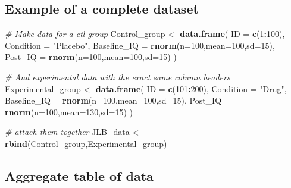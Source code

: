 \documentclass[
]{book}
\newenvironment{Shaded}{\begin{snugshade}}{\end{snugshade}}
\newcommand{\AttributeTok}[1]{\textcolor[rgb]{0.13,0.29,0.53}{#1}}
\newcommand{\CommentTok}[1]{\textcolor[rgb]{0.56,0.35,0.01}{\textit{#1}}}
\newcommand{\DecValTok}[1]{\textcolor[rgb]{0.00,0.00,0.81}{#1}}
\newcommand{\FunctionTok}[1]{\textcolor[rgb]{0.13,0.29,0.53}{\textbf{#1}}}
\newcommand{\NormalTok}[1]{#1}
\newcommand{\OtherTok}[1]{\textcolor[rgb]{0.56,0.35,0.01}{#1}}
\newcommand{\SpecialCharTok}[1]{\textcolor[rgb]{0.81,0.36,0.00}{\textbf{#1}}}
\newcommand{\StringTok}[1]{\textcolor[rgb]{0.31,0.60,0.02}{#1}}
\begin{document}
\subsection*{Example of a complete dataset}\label{example-of-a-complete-dataset}

\begin{Shaded}
\begin{Highlighting}[]
\CommentTok{\# Make data for a ctl group}
\NormalTok{Control\_group }\OtherTok{\textless{}{-}} \FunctionTok{data.frame}\NormalTok{(}
  \AttributeTok{ID =} \FunctionTok{c}\NormalTok{(}\DecValTok{1}\SpecialCharTok{:}\DecValTok{100}\NormalTok{),}
  \AttributeTok{Condition =} \StringTok{"Placebo"}\NormalTok{,}
  \AttributeTok{Baseline\_IQ =} \FunctionTok{rnorm}\NormalTok{(}\AttributeTok{n=}\DecValTok{100}\NormalTok{,}\AttributeTok{mean=}\DecValTok{100}\NormalTok{,}\AttributeTok{sd=}\DecValTok{15}\NormalTok{),}
  \AttributeTok{Post\_IQ =} \FunctionTok{rnorm}\NormalTok{(}\AttributeTok{n=}\DecValTok{100}\NormalTok{,}\AttributeTok{mean=}\DecValTok{100}\NormalTok{,}\AttributeTok{sd=}\DecValTok{15}\NormalTok{)}
\NormalTok{)}

\CommentTok{\# And experimental data with the exact same column headers}
\NormalTok{Experimental\_group }\OtherTok{\textless{}{-}} \FunctionTok{data.frame}\NormalTok{(}
  \AttributeTok{ID =} \FunctionTok{c}\NormalTok{(}\DecValTok{101}\SpecialCharTok{:}\DecValTok{200}\NormalTok{),}
  \AttributeTok{Condition =} \StringTok{"Drug"}\NormalTok{,}
  \AttributeTok{Baseline\_IQ =} \FunctionTok{rnorm}\NormalTok{(}\AttributeTok{n=}\DecValTok{100}\NormalTok{,}\AttributeTok{mean=}\DecValTok{100}\NormalTok{,}\AttributeTok{sd=}\DecValTok{15}\NormalTok{),}
  \AttributeTok{Post\_IQ =} \FunctionTok{rnorm}\NormalTok{(}\AttributeTok{n=}\DecValTok{100}\NormalTok{,}\AttributeTok{mean=}\DecValTok{130}\NormalTok{,}\AttributeTok{sd=}\DecValTok{15}\NormalTok{)}
\NormalTok{)}

\CommentTok{\# attach them together}
\NormalTok{JLB\_data }\OtherTok{\textless{}{-}} \FunctionTok{rbind}\NormalTok{(Control\_group,Experimental\_group)}
\end{Highlighting}
\end{Shaded}

\subsection*{Aggregate table of data}\label{aggregate-table-of-data}
\end{document}

